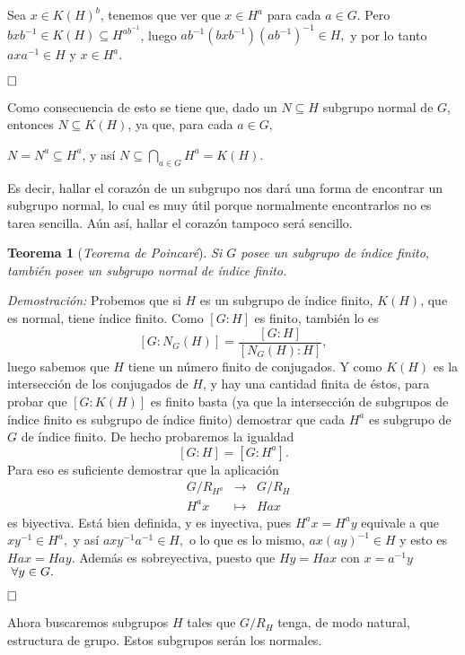 \documentclass[12pt]{article}
\newtheorem{theorem}{Teorema}[section]
\begin{document}
Sea $x \in K(H)^{b}$, tenemos que ver que $x \in H^{a}$ para cada $a \in G$. Pero $
bxb^{-1} \in K(H) \subseteq H^{ab^{-1}}$, luego $ab^{-1}(bxb^{-1})(ab^{-1})^{-1} \in H,$ y por lo tanto $axa^{-1} \in H$ y $x\in H^{a}$.

$\hfill \square$

Como consecuencia de esto se tiene que, dado un $N \subseteq H$ subgrupo normal de $G$, entonces $N \subseteq K(H)$, ya que, para cada $a \in G$, 
\begin{center}
$N= N^{a} \subseteq H^{a}$, y así $N \subseteq \bigcap_{a \in G}H^{a} = K(H).$
\end{center}

Es decir, hallar el corazón de un subgrupo nos dará una forma de encontrar un subgrupo normal, lo cual es muy útil porque normalmente encontrarlos no es tarea sencilla. Aún así, hallar el corazón tampoco será sencillo.
\begin{theorem}[\textit{Teorema de Poincaré}]
Si $G$ posee un subgrupo de índice finito, también posee un subgrupo normal de índice finito.
\end{theorem}
\emph{Demostración: }Probemos que si $H$ es un subgrupo de índice finito, $K(H)$, que es normal, tiene índice finito. Como $\left[ G:H \right]$ es finito, también lo es $$\left[ G:N_{G}(H) \right] = \frac{\left[ G:H \right]}{\left[ N_{G}(H):H \right]},$$ luego sabemos que $H$ tiene un número finito de conjugados. Y como $K(H)$ es la intersección de los conjugados de $H$, y hay una cantidad finita de éstos, para probar que $\left[ G:K(H) \right]$ es finito basta (ya que la intersección de subgrupos de índice finito es subgrupo de índice finito) demostrar que cada $H^{a}$ es subgrupo de $G$ de índice finito. De hecho probaremos la igualdad $$\left[ G:H \right] = \left[ G:H^{a} \right].$$ Para eso es suficiente demostrar que la aplicación $$
\begin{array}{rccl}
&G/R_{H^{a}} & \longrightarrow & G/R_{H}\\
&H^{a}x & \longmapsto &Hax
\end{array}
$$ es biyectiva. Está bien definida, y es inyectiva, pues $H^{a}x = H^{a}y$ equivale a que $xy^{-1} \in H^{a},$ y así $axy^{-1}a^{-1} \in H,$ o lo que es lo mismo, $ax(ay)^{-1} \in H$ y esto es $Hax = Hay.$ Además es sobreyectiva, puesto que $Hy = Hax$ con $x=a^{-1}y$ $\hspace{0.1cm} \forall y \in G.$

$\hfill \square$

Ahora buscaremos subgrupos $H$ tales que $G/R_{H}$ tenga, de modo natural, estructura de grupo. Estos subgrupos serán los normales.
\end{document}
